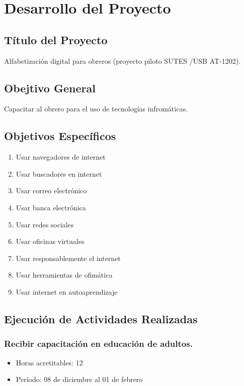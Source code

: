 	\chapter{Desarrollo del Proyecto}

        \section{Título del Proyecto}
            Alfabetización digital para obreros (proyecto piloto SUTES /USB AT-1202).
            
        \section{Obejtivo General}
            Capacitar al obrero para el uso de tecnologías infromáticas.
            
        \section{Objetivos Específicos}
            \begin{enumerate}
                \item Usar navegadores de internet
                \item Usar buscadores en internet
                \item Usar correo electrónico
                \item Usar banca electrónica
                \item Usar redes sociales
                \item Usar oficinas virtuales
                \item Usar responsablemente el internet
                \item Usar herramientas de ofimática
                \item Usar internet en autoaprendizaje
            \end{enumerate}
            
        \section{Ejecución de Actividades Realizadas}

             \subsection {Recibir capacitación en educación de adultos.}
             \begin{itemize}
                 \item Horas acretitables: 12
                 \item Período: 08 de diciembre al 01 de febrero
                \end{itemize}
             

